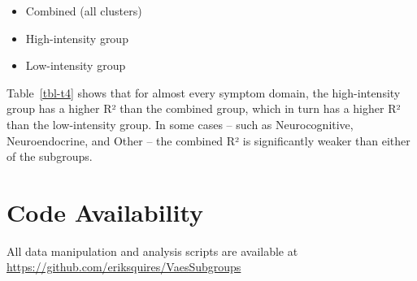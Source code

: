 \documentclass[
  letterpaper,
  DIV=11,
  numbers=noendperiod]{scrartcl}
\providecommand{\tightlist}{%
  \setlength{\itemsep}{0pt}\setlength{\parskip}{0pt}}
\begin{document}
\begin{itemize}
\tightlist
\item
  Combined (all clusters)
\item
  High-intensity group
\item
  Low-intensity group
\end{itemize}

\FloatBarrier

\begin{table}[h]

\caption{\label{tbl-t4}R² by Domain}


\end{table}%

Table~\ref{tbl-t4} shows that for almost every symptom domain, the
high-intensity group has a higher R² than the combined group, which in
turn has a higher R² than the low-intensity group. In some cases -- such
as Neurocognitive, Neuroendocrine, and Other -- the combined R² is
significantly weaker than either of the subgroups.

\FloatBarrier
\bigskip

\section*{Code Availability}\label{sec-code}

All data manipulation and analysis scripts are available at
\url{https://github.com/eriksquires/VaesSubgroups}
\end{document}
